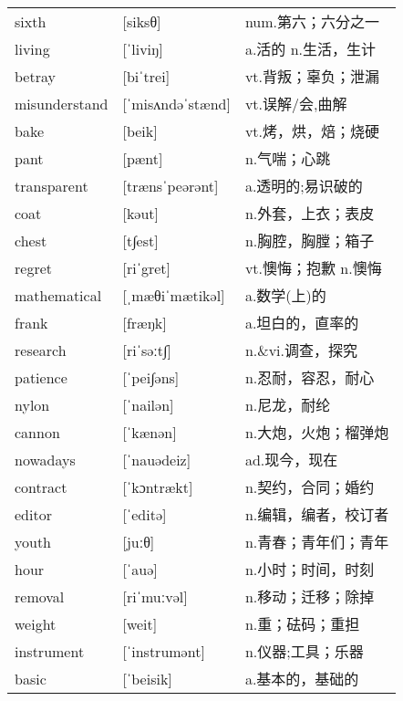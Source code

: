 \documentclass[a4paper]{article}
\begin{document}
\section{}
\begin{tabular}{l l l}

sixth & [siksθ] & num.第六；六分之一 \\
living & [ˈliviŋ] & a.活的 n.生活，生计 \\
betray & [biˈtrei] & vt.背叛；辜负；泄漏 \\
misunderstand & [ˈmisʌndəˈstænd] & vt.误解/会,曲解 \\
bake & [beik] & vt.烤，烘，焙；烧硬 \\
pant & [pænt] & n.气喘；心跳 \\
transparent & [trænsˈpeərənt] & a.透明的;易识破的 \\
coat & [kəut] & n.外套，上衣；表皮 \\
chest & [t∫est] & n.胸腔，胸膛；箱子 \\
regret & [riˈgret] & vt.懊悔；抱歉 n.懊悔 \\
mathematical & [ˌmæθiˈmætikəl] & a.数学(上)的 \\
frank & [fræŋk] & a.坦白的，直率的 \\
research & [riˈsəːt∫] & n.\&vi.调查，探究 \\
patience & [ˈpei∫əns] & n.忍耐，容忍，耐心 \\
nylon & [ˈnailən] & n.尼龙，耐纶 \\
cannon & [ˈkænən] & n.大炮，火炮；榴弹炮 \\
nowadays & [ˈnauədeiz] & ad.现今，现在 \\
contract & [ˈkɔntrækt] & n.契约，合同；婚约 \\
editor & [ˈeditə] & n.编辑，编者，校订者 \\
youth & [juːθ] & n.青春；青年们；青年 \\
hour & [ˈauə] & n.小时；时间，时刻 \\
removal & [riˈmuːvəl] & n.移动；迁移；除掉 \\
weight & [weit] & n.重；砝码；重担 \\
instrument & [ˈinstrumənt] & n.仪器;工具；乐器 \\
basic & [ˈbeisik] & a.基本的，基础的 \\

\end{tabular}
\end{document}
